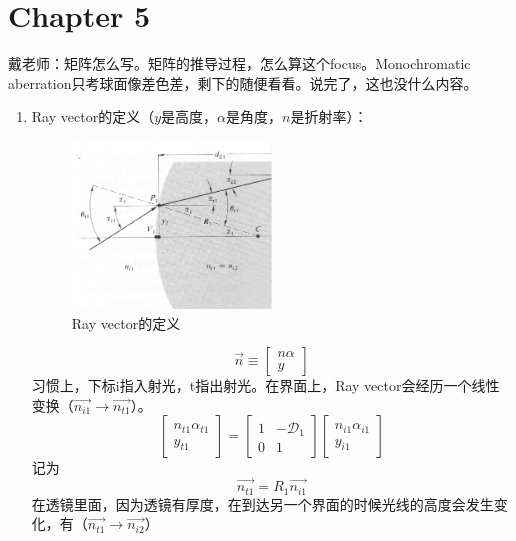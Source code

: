 \documentclass{ctexart}
\begin{document}
\section{Chapter 5}
戴老师：矩阵怎么写。矩阵的推导过程，怎么算这个focus。Monochromatic aberration只考球面像差色差，剩下的随便看看。说完了，这也没什么内容。
\begin{enumerate}
\item Ray vector的定义（$y$是高度，$\alpha$是角度，$n$是折射率）：
\begin{figure}
\center
\includegraphics[width=0.5\textwidth]{RayVec.png}
\caption{Ray vector的定义}
\end{figure}
\begin{equation}
\vec{n} \equiv\left[\begin{array}{c}{n \alpha} \\ {y}\end{array}\right]
\end{equation}
习惯上，下标i指入射光，t指出射光。在界面上，Ray vector会经历一个线性变换（$\vec{n_{i1}}\to \vec{n_{t1}}$）。
\begin{equation}
\left[\begin{array}{c}{n_{t 1} \alpha_{t 1}} \\ {y_{t 1}}\end{array}\right]=\left[\begin{array}{cc}{1} & {-\mathcal{D}_{1}} \\ {0} & {1}\end{array}\right]\left[\begin{array}{c}{n_{i 1} \alpha_{i 1}} \\ {y_{i 1}}\end{array}\right]
\end{equation}
记为
\begin{equation}
\vec{n_{t1}}=R_1 \vec{n_{i1}}
\end{equation}
在透镜里面，因为透镜有厚度，在到达另一个界面的时候光线的高度会发生变化，有（$\vec{n_{t1}}\to \vec{n_{i2}}$）

\end{enumerate}
\end{document}
